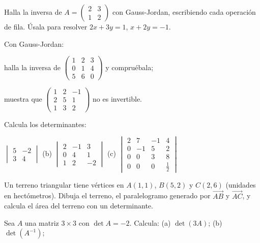 \documentclass[11pt,a4paper]{article}
\begin{document}
\taller
\begin{ejercicios}[itemsep=6pt]
\item Halla la inversa de $A=\begin{pmatrix} 2 & 3\\ 1 & 2\end{pmatrix}$ con Gauss-Jordan, escribiendo cada operación de fila.
  Úsala para resolver $2x+3y=1$, $x+2y=-1$.
\item Con Gauss-Jordan:
  \begin{ejercicios}
  \item halla la inversa de $\begin{pmatrix} 1 & 2 & 3\\ 0 & 1 & 4\\ 5 & 6 & 0\end{pmatrix}$ y compruébala;
  \item muestra que $\begin{pmatrix} 1 & 2 & -1\\ 2 & 5 & 1\\ 1 & 3 & 2\end{pmatrix}$ no es invertible.
  \end{ejercicios}
\item Calcula los determinantes:
  \begin{ejercicios}
  \item $\begin{vmatrix} 5 & -2\\ 3 & 4\end{vmatrix}$ \qquad
  (b) $\begin{vmatrix} 2 & -1 & 3\\ 0 & 4 & 1\\ 1 & 2 & -2\end{vmatrix}$ \qquad
  (c) $\begin{vmatrix} 2 & 7 & -1 & 4\\ 0 & -1 & 5 & 2\\ 0 & 0 & 3 & 8\\ 0 & 0 & 0 & \tfrac12\end{vmatrix}$
  \end{ejercicios}
\item Un terreno triangular tiene vértices en $A(1,1)$, $B(5,2)$ y $C(2,6)$ (unidades en hectómetros).
  Dibuja el terreno, el paralelogramo generado por $\overrightarrow{AB}$ y $\overrightarrow{AC}$, y calcula el área del
  terreno con un determinante.
\item Sea $A$ una matriz $3\times3$ con $\det A=-2$. Calcula: (a) $\det(3A)$; (b) $\det\left(A^{-1}\right)$;

\end{ejercicios}
\end{document}
